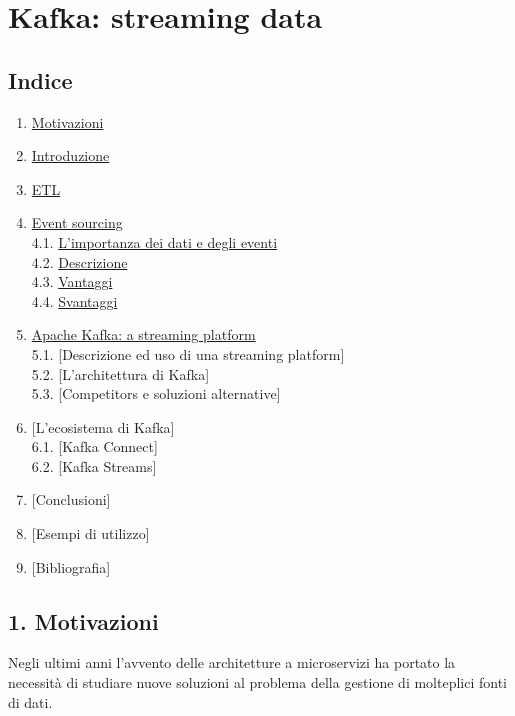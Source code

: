 \documentclass[]{article}
\date{}
\providecommand{\tightlist}{%
  \setlength{\itemsep}{0pt}\setlength{\parskip}{0pt}}
\begin{document}
\section{Kafka: streaming data}\label{kafka-streaming-data}

\subsection{Indice}\label{indice}

\begin{enumerate}
\def\labelenumi{\arabic{enumi}.}
\tightlist
\item
  \protect\hyperlink{motivazioni}{Motivazioni}
\item
  \protect\hyperlink{introduzione}{Introduzione}
\item
  \protect\hyperlink{etl}{ETL}
\item
  \protect\hyperlink{event-sourcing}{Event sourcing}\\
  4.1. \protect\hyperlink{intro-data}{L'importanza dei dati e degli
  eventi}\\
  4.2. \protect\hyperlink{es-desc}{Descrizione}\\
  4.3. \protect\hyperlink{es-vantaggi}{Vantaggi}\\
  4.4. \protect\hyperlink{es-svantaggi}{Svantaggi}
\item
  \protect\hyperlink{kafka-desc}{Apache Kafka: a streaming platform}\\
  5.1. {[}Descrizione ed uso di una streaming platform{]}\\
  5.2. {[}L'architettura di Kafka{]}\\
  5.3. {[}Competitors e soluzioni alternative{]}
\item
  {[}L'ecosistema di Kafka{]}\\
  6.1. {[}Kafka Connect{]}\\
  6.2. {[}Kafka Streams{]}
\item
  {[}Conclusioni{]}
\item
  {[}Esempi di utilizzo{]}
\item
  {[}Bibliografia{]}
\end{enumerate}

\newpage

\hypertarget{motivazioni}{\subsection{1.
Motivazioni}\label{motivazioni}}

Negli ultimi anni l'avvento delle architetture a microservizi ha portato
la necessità di studiare nuove soluzioni al problema della gestione di
molteplici fonti di dati.
\end{document}

